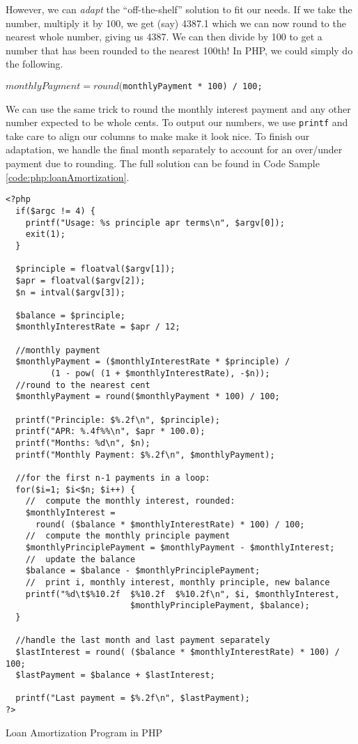 However, we can \emph{adapt} the ``off-the-shelf'' solution to fit our needs.  
If we take the number, multiply it by 100, we get (say) 4387.1 which we can
now round to the nearest whole number, giving us 4387.  We can then 
divide by 100 to get a number that has been rounded to the nearest 100th!
In PHP, we could simply do the following.

\texttt{$monthlyPayment = round($monthlyPayment * 100) / 100;}

We can use the same trick to round the monthly interest payment and any
other number expected to be whole cents.  To output our numbers, we use
\texttt{printf} and take care to align our columns to make make it look 
nice.  To finish our adaptation, we handle the final month separately to account
for an over/under payment due to rounding.  The full solution can be found
in Code Sample \ref{code:php:loanAmortization}.

\begin{listing}
\begin{verbatim}
<?php
  if($argc != 4) {
    printf("Usage: %s principle apr terms\n", $argv[0]);
    exit(1);
  }

  $principle = floatval($argv[1]);
  $apr = floatval($argv[2]);
  $n = intval($argv[3]);

  $balance = $principle;
  $monthlyInterestRate = $apr / 12;

  //monthly payment
  $monthlyPayment = ($monthlyInterestRate * $principle) /
         (1 - pow( (1 + $monthlyInterestRate), -$n));
  //round to the nearest cent
  $monthlyPayment = round($monthlyPayment * 100) / 100;

  printf("Principle: $%.2f\n", $principle);
  printf("APR: %.4f%%\n", $apr * 100.0);
  printf("Months: %d\n", $n);
  printf("Monthly Payment: $%.2f\n", $monthlyPayment);

  //for the first n-1 payments in a loop:
  for($i=1; $i<$n; $i++) {
    //  compute the monthly interest, rounded:
    $monthlyInterest =
      round( ($balance * $monthlyInterestRate) * 100) / 100;
    //  compute the monthly principle payment
    $monthlyPrinciplePayment = $monthlyPayment - $monthlyInterest;
    //  update the balance
    $balance = $balance - $monthlyPrinciplePayment;
    //  print i, monthly interest, monthly principle, new balance
    printf("%d\t$%10.2f  $%10.2f  $%10.2f\n", $i, $monthlyInterest,
                         $monthlyPrinciplePayment, $balance);
  }

  //handle the last month and last payment separately
  $lastInterest = round( ($balance * $monthlyInterestRate) * 100) / 100;
  $lastPayment = $balance + $lastInterest;

  printf("Last payment = $%.2f\n", $lastPayment);
?>
\end{verbatim}
\caption{Loan Amortization Program in PHP}
\label{code:php:loanAmortization}
\end{listing}


